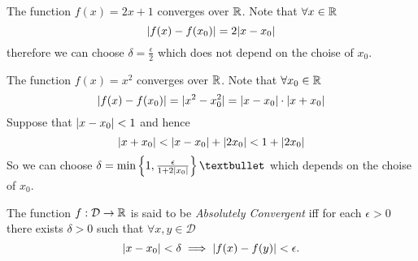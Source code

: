 \newpage
\begin{example}
  The function $f(x)=2x+1$ converges over $\mathbb{R}$.
  Note that $\forall x\in\mathbb{R}$
  \[\lvert f(x)-f(x_0)\rvert=2\lvert x-x_0\rvert\]
  therefore we can choose $\delta=\frac{\epsilon}{2}$
  which does not depend on the choise of $x_0$.
\end{example}
\begin{example}
  The function $f(x)=x^2$ converges over $\mathbb{R}$.
  Note that $\forall x_0\in\mathbb{R}$
  \[\lvert f(x)-f(x_0)\rvert=\lvert x^2-x_0^2\rvert=\lvert x-x_0\rvert\cdot\lvert x+x_0\rvert\]
  Suppose that $\lvert x-x_0\rvert<1$ and hence 
  \[\lvert x+x_0\rvert<\lvert x-x_0\rvert+\lvert2x_0\rvert<1+\lvert2x_0\rvert\]
  So we can choose $\delta=\min\left\{1,\frac{\epsilon}{1+2\abs{x_0}}\right\}•$
  which depends on the choise of $x_0$.
\end{example}
\begin{definition}
  The function $f:\mathcal{D}\to\mathbb{R}$ is said to be \emph{Absolutely Convergent}
  iff for each $\epsilon>0$ there exists $\delta>0$ such 
  that $\forall x,y\in\mathcal{D}$ 
  \[\lvert x-x_0\rvert<\delta\implies\lvert f(x)-f(y)\rvert<\epsilon.\]
\end{definition}




